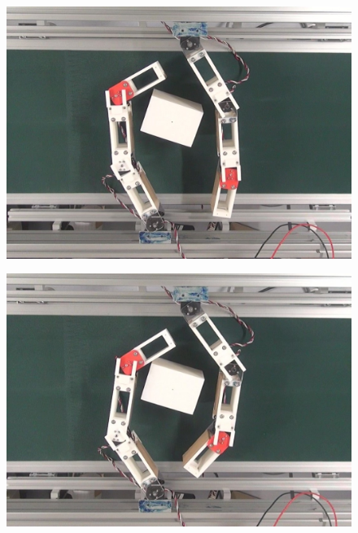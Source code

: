 \documentclass[a4paper,twoside,12pt,papersize, dvipdfmx]{iirthesis}
\begin{document}
\begin{figure}[hbt]
\centering
\begin{minipage}{0.249\hsize}
\centering
\includegraphics[width=0.98\hsize]{fig/4-manipulation-result/Rectangle/1-1.jpg}
\subcaption{}\label{}
\end{minipage}\hfill
\begin{minipage}{0.249\hsize}
\centering
\includegraphics[width=0.98\hsize]{fig/4-manipulation-result/Rectangle/1-2.jpg}
\subcaption{}\label{}
\end{minipage}\hfill
\begin{minipage}{0.249\hsize}
\centering

\end{minipage}
\end{figure}
\end{document}
